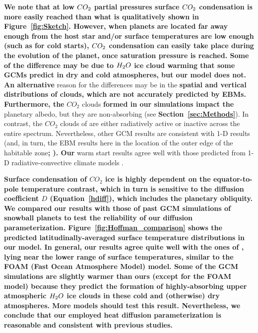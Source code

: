 \documentclass[fleqn,usenatbib]{mnras}
\providecommand{\DIFadd}[1]{{\bf #1}} %
\providecommand{\DIFdel}[1]{} %
\providecommand{\DIFaddbegin}{} %
\providecommand{\DIFaddend}{} %
\providecommand{\DIFdelbegin}{} %
\providecommand{\DIFdelend}{} %
\newcommand{\DIFscaledelfig}{0.5}
\newlength{\DIFdelgraphicswidth} %
\newlength{\DIFdelgraphicsheight} %
\newcommand{\DIFaddincludegraphics}[2][]{{\color{blue}\fbox{\DIFOincludegraphics[#1]{#2}}}} %
\newcommand{\DIFdelincludegraphics}[2][]{%
\sbox{\DIFdelgraphicsbox}{\DIFOincludegraphics[#1]{#2}}%
\settoboxwidth{\DIFdelgraphicswidth}{\DIFdelgraphicsbox} %
\settoboxtotalheight{\DIFdelgraphicsheight}{\DIFdelgraphicsbox} %
\scalebox{\DIFscaledelfig}{%
\parbox[b]{\DIFdelgraphicswidth}{\usebox{\DIFdelgraphicsbox}\\[-\baselineskip] \rule{\DIFdelgraphicswidth}{0em}}\llap{\resizebox{\DIFdelgraphicswidth}{\DIFdelgraphicsheight}{%
\setlength{\unitlength}{\DIFdelgraphicswidth}%
\begin{picture}(1,1)%
\thicklines\linethickness{2pt} %
{\color[rgb]{1,0,0}\put(0,0){\framebox(1,1){}}}%
{\color[rgb]{1,0,0}\put(0,0){\line( 1,1){1}}}%
{\color[rgb]{1,0,0}\put(0,1){\line(1,-1){1}}}%
\end{picture}%
}\hspace*{3pt}}} %
} %
\DeclareRobustCommand{\DIFaddbegin}{\DIFOaddbegin \let\includegraphics\DIFaddincludegraphics} %
\DeclareRobustCommand{\DIFaddend}{\DIFOaddend \let\includegraphics\DIFOincludegraphics} %
\DeclareRobustCommand{\DIFdelbegin}{\DIFOdelbegin \let\includegraphics\DIFdelincludegraphics} %
\DeclareRobustCommand{\DIFdelend}{\DIFOaddend \let\includegraphics\DIFOincludegraphics} %
\begin{document}
\DIFdelbegin \DIFdel{Another }\DIFdelend \DIFaddbegin \DIFadd{We note that at low $CO_{\rm 2}$ partial pressures surface $CO_{\rm 2}$ condensation is more easily reached than what is qualitatively shown in Figure~\ref{fig:Sketch}. However, when planets are located far away enough from the host star and/or surface temperatures are low enough (such as for cold starts), $CO_{\rm 2}$ condensation can easily take place during the evolution of the planet, once saturation pressure is reached. Some of the difference may be due to $H_{\rm 2}O$ ice cloud warming that some GCMs predict in dry and cold atmospheres, but our model does not. An alternative }\DIFaddend reason for the differences may be in the \DIFdelbegin \DIFdel{treatment of clouds. For instance, our }\DIFdelend \DIFaddbegin \DIFadd{spatial and vertical distributions of clouds, which are not accurately predicted by EBMs. Furthermore, the }\DIFaddend $CO_{\mathrm{2}}$ clouds \DIFdelbegin \DIFdel{impact }\DIFdelend \DIFaddbegin \DIFadd{formed in our simulations impact the }\DIFaddend planetary albedo, but they are non-absorbing (see \DIFdelbegin \DIFdel{Methods}\DIFdelend \DIFaddbegin \DIFadd{Section~\ref{sec:Methods}}\DIFaddend ). In contrast, the $CO_{\mathrm{2}}$ clouds of \citet{Turbet2017} are either radiatively active or inactive across the entire spectrum. Nevertheless, other GCM results are consistent with 1-D results (and, in turn, the EBM results here \DIFdelbegin \DIFdel{) }\DIFdelend in the location of the outer edge of the habitable zone\DIFdelbegin \DIFdel{\citep{wolf2018erratum}.
Also, our }\DIFdelend \DIFaddbegin \DIFadd{; \citet{wolf2018erratum}).
Our }\DIFaddend warm start results agree well with those predicted from 1-D radiative-convective climate models \citep{kasting1993, KumarKopparapu2013, Ramirez2018}.
\DIFdelbegin \DIFdel{However, it is unclear how GCMs with fully-coupled atmospheric oceans may compare with the results here. This would be an interesting consideration for future studies. }\DIFdelend 

\DIFaddbegin \DIFadd{Surface condensation of $CO_{\mathrm{2}}$ ice is highly dependent on the equator-to-pole temperature contrast, which in turn is sensitive to the diffusion coefficient $D$ (Equation~\ref{hdiff}), which includes the planetary obliquity. We compared our results with those of past GCM simulations of snowball planets \citep{hoffman_snowball_2017} to test the reliability of our diffusion parameterization. Figure~\ref{fig:Hoffman_comparison} shows the predicted latitudinally-averaged surface temperature distributions in our model. In general, our results agree quite well with the ones of \citet{hoffman_snowball_2017}, lying near the lower range of surface temperatures, similar to the FOAM (Fast Ocean Atmosphere Model) model. Some of the GCM simulations are slightly warmer than ours (except for the FOAM model) because they predict the formation of highly-absorbing upper atmospheric $H_{\rm 2}O$ ice clouds in these cold and (otherwise) dry atmospheres. More models should test this result. Nevertheless, we conclude that our employed heat diffusion parameterization is reasonable and consistent with previous studies.
}
\end{document}
